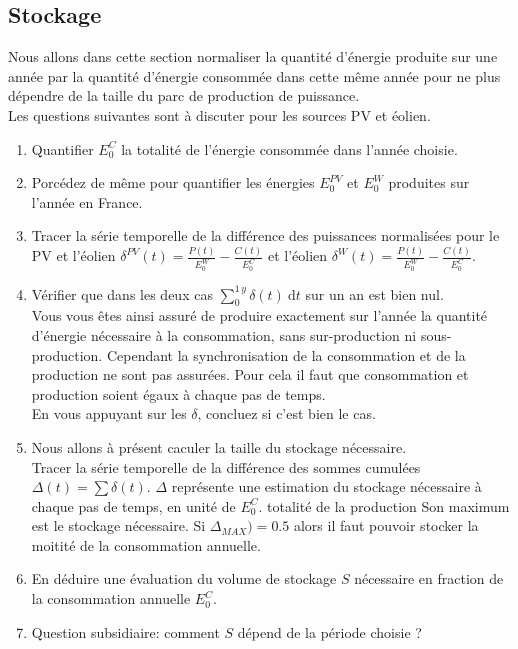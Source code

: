 \documentclass[12pt,french]{article}
\begin{document}
\subsection{Stockage}
Nous allons dans cette section normaliser la quantité d'énergie produite sur une année par la quantité d'énergie consommée dans cette même année pour ne plus dépendre de la taille du parc de production de puissance. \\
Les questions suivantes sont à discuter pour les sources PV et éolien.
\begin{enumerate}
	\item Quantifier $E_0^C$ la totalité de l'énergie consommée dans l'année choisie. 
	
	\item Porcédez de même pour quantifier les énergies $E_0^{PV}$ et $E_0^{W}$ produites sur l'année en France.
	
	\item Tracer la série temporelle de la différence des puissances normalisées pour le PV et l'éolien $\delta^{PV} (t) = \frac{P(t)}{E_0^{W}} - \frac{C(t)}{E_0^C}$ et l'éolien $\delta^{W}(t) = \frac{P(t)}{E_0^{W}} - \frac{C(t)}{E_0^C}$. 
	
	\item Vérifier que dans les deux cas $\sum_0^{1\,y} \delta(t) ~ \text{d} t $ sur un an est bien nul. \\
	Vous vous êtes ainsi assuré de produire exactement sur l'année la quantité d'énergie nécessaire à la consommation, sans sur-production ni sous-production. Cependant la synchronisation de la consommation et de la production ne sont pas assurées. Pour cela il faut que consommation et production soient égaux à chaque pas de temps.\\ 
	En vous appuyant sur les $\delta$, concluez si c'est bien le cas.
	
	\item Nous allons à présent caculer la taille du stockage nécessaire. \\
	Tracer la série temporelle de la différence des sommes cumulées $\Delta(t) = \sum \delta (t)$. $\Delta $ représente une estimation du stockage nécessaire à chaque pas de temps, en unité de $E_0^C$.  totalité de la production  Son maximum est le stockage nécessaire. Si $\Delta_{MAX})=0.5$ alors il faut pouvoir stocker la moitité de la consommation annuelle.
	
	\item En déduire une évaluation du volume de stockage $S$ nécessaire en fraction de la consommation annuelle $E_0^C$.
	
	\item Question subsidiaire: comment $S$ dépend de la période choisie ?
	
\end{enumerate}
\end{document}

